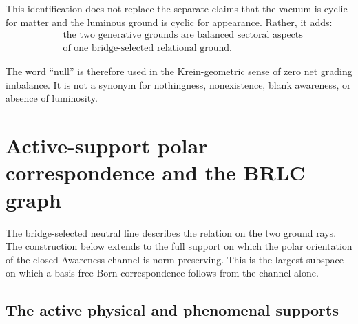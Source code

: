 \documentclass[11pt,reqno]{scrartcl}
\theoremstyle{plain}
\theoremstyle{definition}
\theoremstyle{remark}
\begin{document}
This identification does not replace the separate claims that the vacuum is
cyclic for matter and the luminous ground is cyclic for appearance.  Rather,
it adds:
\begin{equation}
  \boxed{
  \begin{aligned}
  &\text{the two generative grounds are balanced sectoral aspects}\\
  &\text{of one bridge-selected relational ground.}
  \end{aligned}}
  \label{eq:two-generative-grounds-one-relation}
\end{equation}

The word ``null'' is therefore used in the Krein-geometric sense of zero net
grading imbalance.  It is not a synonym for nothingness, nonexistence, blank
awareness, or absence of luminosity.
\section{Active-support polar correspondence and the BRLC graph}
\label{sec:active-support-brlc-geometry}

The bridge-selected neutral line describes the relation on the two ground
rays.  The construction below extends to the full support on which the polar
orientation of the closed Awareness channel is norm preserving.  This is the
largest subspace on which a basis-free Born correspondence follows from the
channel alone.

\subsection{The active physical and phenomenal supports}
\end{document}
